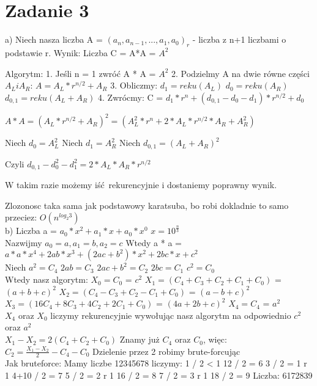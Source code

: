 \documentclass[12pt]{article}
\begin{document}
\section{Zadanie 3}
a)
Niech nasza liczba A = $(a_n, a_{n-1}, ..., a_1, a_0)_r$ - liczba z n+1 liczbami o podstawie r.
Wynik: Liczba C = A*A = $A^2$

Algorytm:
1. Jeśli n = 1 zwróć A * A = $A^2$
2. Podzielmy A na dwie równe części $A_L i A_R$:
$A = A_L * r^{n/2} + A_R$
3. Obliczmy:
$d_1 = reku(A_L)$
$d_0 = reku(A_R)$
$d_{0, 1} = reku(A_L + A_R)$
4. Zwrócmy:
C = $d_1 * r^n + (d_{0, 1} - d_0 - d_1) * r^{n/2} + d_0$

$A*A = (A_L * r^{n/2} + A_R)^2 = (A_L^2 * r^n + 2 * A_L * r^{n/2} * A_R + A_R^2)$

Niech $d_0 = A_L^2$
Niech $d_1 = A_R^2$
Niech $d_{0, 1} = (A_L + A_R)^2$

Czyli $d_{0, 1} - d_0^2 - d_1^2 = 2 * A_L * A_R * r^{n/2}$

W takim razie możemy iść rekurencyjnie i dostaniemy poprawny wynik. 

Zlozonosc taka sama jak podstawowy karatsuba, bo robi dokladnie to samo przeciez:
$O(n^{log_2 3})$\\

b)
Liczba a = $a_0 * x^2 + a_1 * x + a_0 * x^0$ 
$x=10^{\frac{n}{3}}$\\

Nazwijmy $a_0 = a, a_1 = b, a_2 = c$
Wtedy a * a = $a*a*x^4 + 2ab * x^3 + (2ac + b^2) * x^2 + 2bc * x + c^2$\\

Niech 
$a^2 = C_4$
$2ab = C_3$
$2ac + b^2 = C_2$
$2bc = C_1$
$c^2 = C_0$\\

Wtedy nasz algorytm:
$X_0 = C_0$ = $c^2$
$X_1 = (C_4 + C_3 + C_2 + C_1 + C_0)$ = $(a+b+c)^2$
$X_2 = (C_4 - C_3 + C_2 - C_1 + C_0)$ = $(a-b+c)^2$
$X_3 = (16C_4 + 8C_3 + 4C_2 + 2C_1 + C_0)$ = $(4a+2b+c)^2$
$X_4 = C_4$ = $a^2$\\

$X_4$ oraz $X_0$ liczymy rekurencyjnie wywołując nasz algorytm na odpowiednio $c^2$ oraz $a^2$\\

$X_1 - X_2 = 2(C_4 + C_2 + C_0)$
Znamy już $C_4$ oraz $C_0$, więc:
$C_2 = \frac{X_1-X_2}{2} - C_4 - C_0$
Dzielenie przez 2 robimy brute-forcując\\

Jak bruteforce:
Mamy liczbe 12345678 
liczymy:
1 / 2 < 1 
12 / 2 = 6
3 / 2 = 1 r 1
4+10 / 2 = 7 
5 / 2 = 2 r 1 
16 / 2 = 8 
7 / 2 = 3 r 1
18 / 2 = 9 
Liczba:
6172839 
\end{document}

